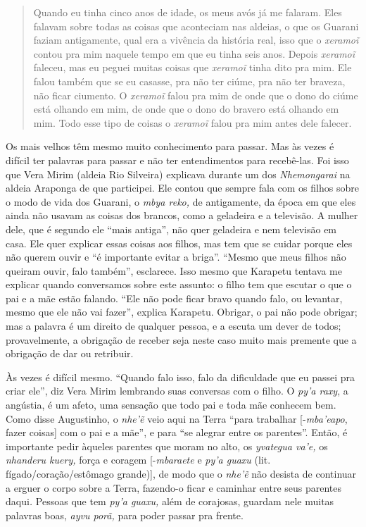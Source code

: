 \begin{quote}
Quando eu tinha cinco anos de idade, os meus avós já me falaram. Eles
falavam sobre todas as coisas que aconteciam nas aldeias, o que os
Guarani faziam antigamente, qual era a vivência da história real, isso
que o \emph{xeramoĩ} contou pra mim naquele tempo em que eu tinha seis
anos. Depois \emph{xeramoĩ} faleceu, mas eu peguei muitas coisas que
\emph{xeramoĩ} tinha dito pra mim. Ele falou também que se eu casasse,
pra não ter ciúme, pra não ter braveza, não ficar ciumento. O
\emph{xeramoĩ} falou pra mim de onde que o dono do ciúme está olhando em
mim, de onde que o dono do bravero está olhando em mim. Todo esse tipo
de coisas o \emph{xeramoĩ} falou pra mim antes dele falecer.
\end{quote}

Os mais velhos têm mesmo muito conhecimento para passar. Mas às vezes é
difícil ter palavras para passar e não ter entendimentos para
recebê-las. Foi isso que Vera Mirim (aldeia Rio Silveira) explicava
durante um dos \emph{Nhemongarai} na aldeia Araponga de que participei.
Ele contou que sempre fala com os filhos sobre o modo de vida dos
Guarani, o \emph{mbya reko,} de antigamente, da época em que eles ainda
não usavam as coisas dos brancos, como a geladeira e a televisão. A
mulher dele, que é segundo ele ``mais antiga'', não quer geladeira e nem
televisão em casa. Ele quer explicar essas coisas aos filhos, mas tem
que se cuidar porque eles não querem ouvir e ``é importante evitar a
briga''. ``Mesmo que meus filhos não queiram ouvir, falo também'',
esclarece. Isso mesmo que Karapetu tentava me explicar quando
conversamos sobre este assunto: o filho tem que escutar o que o pai e a
mãe estão falando. ``Ele não pode ficar bravo quando falo, ou levantar,
mesmo que ele não vai fazer'', explica Karapetu. Obrigar, o pai não pode
obrigar; mas a palavra é um direito de qualquer pessoa, e a escuta um
dever de todos; provavelmente, a obrigação de receber seja neste caso
muito mais premente que a obrigação de dar ou retribuir.

Às vezes é difícil mesmo. ``Quando falo isso, falo da dificuldade que eu
passei pra criar ele'', diz Vera Mirim lembrando suas conversas com o
filho. O \emph{py'a raxy}, a angústia, é um afeto, uma sensação que todo
pai e toda mãe conhecem bem. Como disse Augustinho, o \emph{nhe'ẽ} veio
aqui na Terra ``para trabalhar {[}-\emph{mba'eapo}, fazer coisas{]} com
o pai e a mãe'', e para ``se alegrar entre os parentes''. Então, é
importante pedir àqueles parentes que moram no alto, os \emph{yvategua
va'e,} os \emph{nhanderu kuery,} força e coragem {[}-\emph{mbaraete} e
\emph{py'a guaxu} (lit. fígado/coração/estômago grande){]}, de modo que
o \emph{nhe'ẽ} não desista de continuar a erguer o corpo sobre a Terra,
fazendo-o ficar e caminhar entre seus parentes daqui\emph{.} Pessoas que
tem \emph{py'a guaxu,} além de corajosas, guardam nele muitas palavras
boas, \emph{ayvu porã,} para poder passar pra frente.

